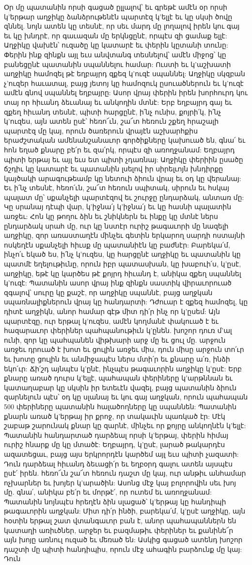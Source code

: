 \documentclass{article}
\begin{document}
{Օր մը պատանին որսի գացած ըլլալով՝ եւ գրեթէ ամէն օր որսի կ'երթար աղջիկը ձանձրութենէն պարտէզ կ'ելլէ եւ կը սկսի ծովը զննել. նոյն ատեն կը տեսնէ, որ սեւ մարդ մը լողալով իրեն կու գայ եւ կը խնդրէ, որ գաւազան մը երկնցընէ, որպէս զի ցամաք ելլէ: Աղջիկը վախէն՝ ուզածը կը կատարէ եւ փերին կըտանի տունը: Փերին ինք զինքն այլ եւս անվտանգ տեսնելով՝ ամէն միջոց՝ կը բանեցընէ պատանին սպաննելու համար: Ուստի եւ կ'աշխատի աղջիկը համոզել թէ եղբայրդ զքեզ կ'ուզէ սպաննել: Աղջիկը սկզբան չ'ուզեր հաւատալ, բայց յետոյ կը համոզուկ ըսուածներուն եւ կ'ուզէ ամէն գնով սպաննել եղբայրը: Ասոր վրայ փերին իրեն խորհուրդ կու տայ որ հիւանդ ձեւանայ եւ անկողին մտնէ: Երբ եղբայրդ գայ եւ զքեղ հիւանդ տեսնէ, պիտի հարցընէ, ի՛նչ ունիս, քոյրի՛կ, ի՛նչ կ'ուզես, այն ատեն ըսէ՝ հեռո՜ւն, շա՜տ հեռուն շքեղ հրաշալի պարտէզ մը կայ, որուն ծառերուն վրայէն աշխարհքիս երաժշտական ամենանշանաւոր գործիքները կախուած են, գնա՛ եւ հոն եղած քնարը բե՛ր եւ զա՛րկ, որպէս զի առողջանամ: Եղբայրդ պիտի երթայ եւ այլ եւս ետ պիտի չդառնայ: Աղջիկը փերիին ըսածը ճշդիւ կը կատարէ եւ պատանին լսելով իր սիրելւոյն խնդիրքը կայծակի արագութեամբ կը նետուի ձիուն վրայ եւ օդ կը վերանայ: Եւ ի՛նչ տեսնէ, հեռո՛ւն, շա՜տ հեռուն սպիտակ, սիրուն եւ հսկայ պալատ մը՝ սքանչելի պարտէզով եւ շուրջը ընդարձակ, անտառ մը: Կը սրանայ դէպի վար, կ'իջնա՛յ կ'իջնա՛յ եւ կը հասնի պալատին առջեւ: Հոն կը թողու ձին եւ շնիկներն եւ ինքը կը մտնէ ներս ընդարձակ սրահ մը, ուր կը նստէր ուրիշ թագաւորի մը նազելի աղջիկը, զոր առաստաղէն մինչեւ գետին երկարող սարդի ոստայնի ոսկեղէն սքանչելի հիւսք մը պատանիէն կը բաժնէր: Բարեկա՛մ, ինչո՛ւ եկած ես, ի՛նչ կ'ուզես, կը հարցընէ աղջիկը եւ պատանին կը պատմէ եղելութիւնը, որուն իբր պատասխան, կը խաբուի՛ս, կ'ըսէ, աղջիկը, եթէ կը կարծես թէ քոյրդ հիւանդ է, անիկա զքեղ սպաննել կ'ուզէ: Պատանին ասոր վրայ ինք զինքն սաստիկ վիրաւորուած զգալով՝ սուրը կը քաշէ, որ աղջիկը սպաննէ, բայց աղջկան սպառնալիքներուն վրայ կը հանդարտի: Դժուար է զքեզ համոզել, կը դիտէ աղջիկն, անոր համար գէթ միտ դի՛ր ինչ որ կ'ըսեմ: Այն պարտէզը, ուր երթալ կ'ուզես, ամէն կողմանէ փակուած է եւ հազարաւոր փերիներ պահպանութիւն կ'ընեն. խոշոր դուռ մ'ալ ունի, զոր կը պահպանեն վիթխարի արջ մը եւ ցուլ մը. արջուն առջեւ դրուած է խոտ եւ ցուլին առջեւ միս, դուն միսը արջուն տո՛ւր եւ խոտը ցուլին եւ անմիջապէս ներս մտի՛ր եւ քնարը ա՛ռ, ինձի եկո՛ւր: Ճի՛շդ այնպէս կ'ընէ, ինչպէս թագաւորին աղջիկը կ'ըսէ: Երբ քնարը առած դուրս կ'ելլէ, պահապան փերիները կ'արթննան եւ կատաղաբար կը սկսին իր ետեւէն վազել, բայց պատանին ձիուն զարնելուն պէս՝ օդ կը սլանայ եւ կու գայ աղջկան, որուն պահապան 500 փերիները պատանին հալածողները կը սպաննեն: Պատանին քնարն առած կ'երթայ իր քրոջ, որ տակաւին պառկած էր: Մէկ շաբաթ շարունակ քնար կը զարնէ, մինչեւ որ քոյրը անկողնէն կ'ելլէ: Պատանին հանդարտած դարձեալ որսի կ'երթայ, փերին հիմայ ուրիշ հնարք մը կը մտածէ: Եղբայրդ, կ'ըսէ, լարած թակարդէս ազատեցաւ, բայց այս երկրորդէն կարծեմ այլ եւս պիտի չազատի: Դուն դարձեալ հիւանդ ձեւացի՛ր եւ եղբօրդ գալու ատեն այսպէս ըսէ՛ իրեն. հեռո՜ւն շա՜տ հեռուն դաշտ մը կայ, ուր անթիւ անհամար ոչխարներ եւ խոյեր կ'արածին: Ասոնց մէջ կայ բոլորովին սեւ խոյ մը. գնա՛, անիկա բե՛ր եւ մորթէ՛, որ ուտեմ եւ առողջանամ: Պատանին նոյնպէս հրեղէն ձին սլացած՝ կ'երթայ կը հանդիպի թագաւորին աղջկան: Միտ դի՛ր ինծի, բարեկա՛մ, կ'ըսէ աղջիկը, այն հօտին երթալ շատ վտանգաւոր բան է, անոր պահապաններն են կատաղի առիւծներ, արջեր եւ բազմաթիւ փերիներ եւ քանինե՜ր այն խոյը առնուլ ուզած եւ մեռած են: Ասկից գացած ատենդ խոշոր դաշտի մը պիտի հանդիպիս, որուն մէջ ահագին բարձունք մը կայ: Դուն }
\end{document}
